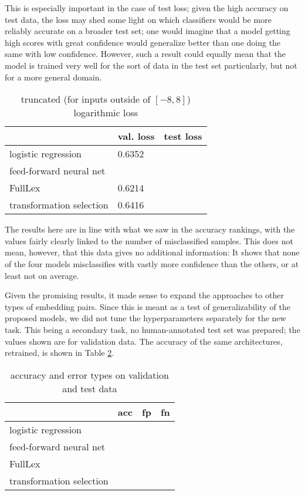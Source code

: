 \documentclass[a4paper, 11pt]{scrartcl}
\begin{document}
This is especially important in the case of test loss; given the high accuracy on test data, the loss may shed some light on which classifiers would be more reliably accurate on a broader test set; one would imagine that a model getting high scores with great confidence would generalize better than one doing the same with low confidence. However, such a result could equally mean that the model is trained very well for the sort of data in the test set particularly, but not for a more general domain.

\begin{table}[]
	\centering
	\begin{tabular}{l|l|l}
		                         & val. loss & test loss \\ \hline
		logistic regression      & 0.6352    &           \\
		feed-forward neural net  &           &           \\
		FullLex                  & 0.6214    &           \\
		transformation selection & 0.6416    &          
	\end{tabular}
	\caption{truncated (for inputs outside of $[-8, 8]$) logarithmic loss}
	\label{loss-an}
\end{table}

The results here are in line with what we saw in the accuracy rankings, with the values fairly clearly linked to the number of misclassified samples. This does not mean, however, that this data gives no additional information: It shows that none of the four models misclassifies with vastly more confidence than the others, or at least not on average.

Given the promising results, it made sense to expand the approaches to other types of embedding pairs. Since this is meant as a test of generalizability of the proposed models, we did not tune the hyperparameters separately for the new task. This being a secondary task, no human-annotated test set was prepared; the values shown are for validation data. The accuracy of the same architectures, retrained, is shown in Table \ref{accuracy-vn}.

\begin{table}[]
	\centering
	\begin{tabular}{l|lll}
		                         & acc      & fp       & fn        \\ \hline
		logistic regression      &          &          &           \\
		feed-forward neural net  &          &          &           \\
		FullLex                  &          &          &           \\
		transformation selection &          &          &
	\end{tabular}
	\caption{accuracy and error types on validation and test data}
	\label{accuracy-vn}
\end{table}
\end{document}
